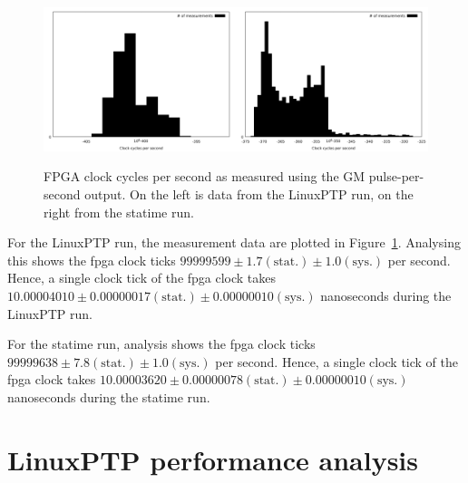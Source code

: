 \documentclass{article}
\begin{document}
\begin{figure}[h]
\includegraphics[width=0.5\textwidth]{gm_clocks_per_sec_ref.pdf}\includegraphics[width=0.5\textwidth]{gm_clocks_per_sec_statime.pdf}
\caption{FPGA clock cycles per second as measured using the GM pulse-per-second output. On the left is data from the LinuxPTP run, on the right from the statime run.}
\label{fig:gm_cycles_per_second}
\end{figure}

For the LinuxPTP run, the measurement data are plotted in Figure~\ref{fig:gm_cycles_per_second}. Analysing this shows the fpga clock ticks $99999599\pm 1.7 (\text{stat.}) \pm 1.0 (\text{sys.})$ per second. Hence, a single clock tick of the fpga clock takes $10.00004010 \pm 0.00000017 (\text{stat.}) \pm 0.00000010 (\text{sys.})$ nanoseconds during the LinuxPTP run.

For the statime run, analysis shows the fpga clock ticks $ 99999638 \pm 7.8 (\text{stat.}) \pm 1.0 (\text{sys.})$ per second. Hence, a single clock tick of the fpga clock takes $10.00003620 \pm 0.00000078 (\text{stat.}) \pm 0.00000010 (\text{sys.})$ nanoseconds during the statime run.

\section {LinuxPTP performance analysis}
\end{document}

